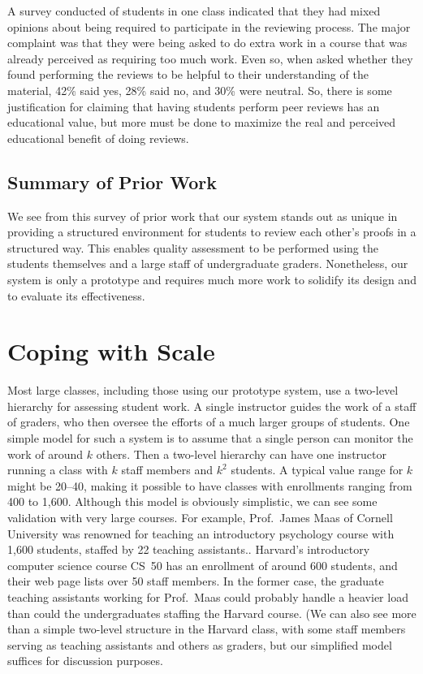 \documentclass[12pt]{article}
\begin{document}
A survey conducted of students in one class indicated that they had
mixed opinions about being required to participate in the reviewing
process.  The major complaint was that they were being asked to do
extra work in a course that was already perceived as requiring too much
work.  Even so, when asked whether they found performing the reviews
to be helpful to their understanding of the material, 42\% said yes,
28\% said no, and 30\% were neutral.  So, there is some justification
for claiming that having students perform peer reviews has an educational
value, but more must be done to maximize the real and perceived
educational benefit of doing reviews.

\subsection{Summary of Prior Work}

We see from this survey of prior work that our system stands out as
unique in providing a structured environment for students to review
each other's proofs in a structured way.  This enables quality
assessment to be performed using the students themselves and a large
staff of undergraduate graders.  Nonetheless, our system is only a
prototype and requires much more work to solidify its design and to
evaluate its effectiveness.

\section{Coping with Scale}

Most large classes, including those using our prototype system, use a
two-level hierarchy for assessing student work.  A single instructor
guides the work of a staff of graders, who then oversee the efforts of
a much larger groups of students.  One simple model for such a system
is to assume that a single person can monitor the work of around $k$
others.  Then a two-level hierarchy can have one instructor running a
class with $k$ staff members and $k^2$ students.  A typical value
range for $k$ might be 20--40, making it possible to have classes with
enrollments ranging from 400 to 1,600.  Although this model is
obviously simplistic, we can see some validation with very large
courses.  For example, Prof.~James Maas of Cornell University was
renowned for teaching an introductory psychology course with 1,600
students, staffed by 22 teaching assistants.\cite{arenson-nyt00}.
Harvard's introductory computer science course CS~50 has an enrollment
of around 600 students, and their web page lists over 50 staff
members.  In the former case, the graduate teaching assistants working
for Prof.~Maas could probably handle a heavier load than could the
undergraduates staffing the Harvard course.  (We can also see more than
a simple two-level structure in the Harvard class, with some staff members
serving as teaching assistants and others as graders, but our
simplified model suffices for discussion purposes.
\end{document}

